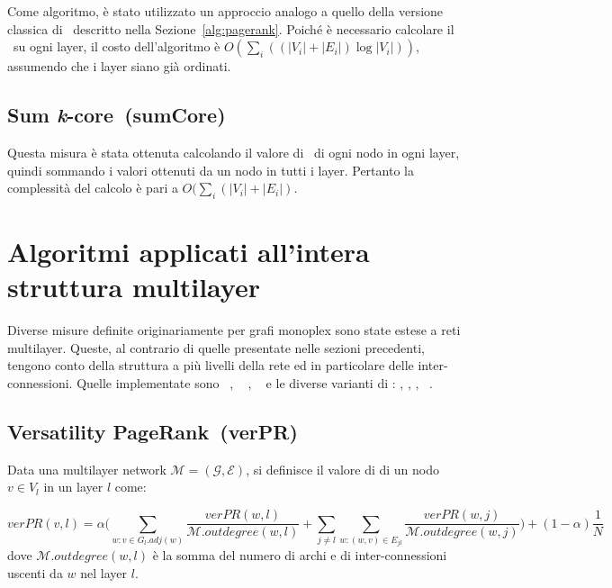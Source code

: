 Come algoritmo, è stato utilizzato un approccio analogo a quello della versione classica di 
\PageRank\ descritto nella Sezione~\vref{alg:pagerank}.
Poiché è necessario calcolare il \PageRank\ su ogni layer, il costo dell'algoritmo è 
$O(\sum_{i}((|V_i| + |E_i|)\log{|V_i|}))$, assumendo che i layer siano già ordinati.

\subsection{Sum \emph{k}-core~(sumCore)}
Questa misura è stata ottenuta calcolando il valore di \kcore\ di ogni nodo in 
ogni layer, quindi sommando i valori ottenuti da un nodo in tutti i layer.
Pertanto la complessità del calcolo è pari a $O(\sum_{i}(|V_i| + |E_i|)$.

\section{Algoritmi applicati all'intera struttura multilayer}
Diverse misure definite originariamente per grafi monoplex sono state estese a 
reti multilayer. Queste, al contrario di quelle presentate nelle sezioni precedenti,
tengono conto della struttura a più livelli della rete ed in particolare delle inter-connessioni.
Quelle implementate sono 
\emph{\verPageRank}~\cite{dedomenico:versatile},
\emph{\verBetweennessCentrality}~\cite{dedomenico:versatile} \cite{dedomenico:verbetw},
\emph{\multiCore}~\cite{azimi:multikcore} e le diverse varianti di \emph{\PCI}: 
\emph{\mlPCI},
\emph{\laPCI},
\emph{\alPCI},
\emph{\lsPCI}~\cite{basaras:infspmul}.

\subsection{Versatility PageRank~(verPR)}
\begin{definizione}[\verPageRank]
    Data una multilayer network $\mathcal{M}=(\mathcal{G}, \mathcal{E})$,
    si definisce il valore di \mbox{\emph{\verPageRank}} di un nodo $v \in V_l$ in un layer $l$
    come:

    \begin{equation*}
        \mathit{verPR}(v, l) = 
        \alpha \biggl( 
            \sum_{w : v \in G_l.\mathit{adj}(w)} \frac{\mathit{verPR}(w, l)}{\mathcal{M}.\mathit{outdegree}(w, l)} +
            \sum_{j \neq l}^{}\sum_{w : (w, v) \in E_{jl}} \frac{\mathit{verPR}(w, j)}{\mathcal{M}.\mathit{outdegree}(w, j)} 
        \biggr) + (1-\alpha)\frac{1}{N}
    \end{equation*}
    dove $\mathcal{M}.\mathit{outdegree}(w, l)$ è la somma del numero di archi e di inter-connessioni uscenti da $w$ nel layer $l$.

\end{definizione}

